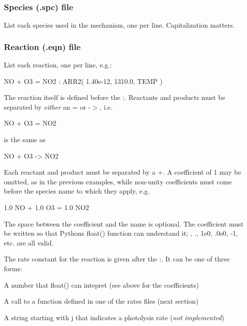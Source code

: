 \subsubsection*{Species (.spc) file}

List each species used in the mechanism, one per line. Capitalization matters.

\subsubsection*{Reaction (.eqn) file}

List each reaction, one per line, e.\+g.\+: \begin{DoxyVerb}NO + O3 = NO2 : ARR2( 1.40e-12, 1310.0, TEMP )
\end{DoxyVerb}


The reaction itself is defined before the {\ttfamily \+:}. Reactants and products must be separated by {\itshape either} an {\ttfamily =} or {\ttfamily -\/$>$}, i.\+e. \begin{DoxyVerb}NO + O3 = NO2
\end{DoxyVerb}


is the same as \begin{DoxyVerb}NO + O3 -> NO2
\end{DoxyVerb}


Each reactant and product must be separated by a {\ttfamily +}. A coefficient of 1 may be omitted, as in the previous examples, while non-\/unity coefficients must come before the species name to which they apply, e.\+g. \begin{DoxyVerb}1.0 NO + 1.0 O3 = 1.0 NO2
\end{DoxyVerb}


The space between the coefficient and the name is optional. The coefficient must be written so that Python\textquotesingle{}s {\ttfamily float()} function can understand it; {}, {.}, {\ttfamily 1e0}, {.\+0e0}, {\ttfamily -\/1}, etc. are all valid.

The rate constant for the reaction is given after the {\ttfamily \+:}. It can be one of three forms\+:


\begin{DoxyEnumerate}
\item A number that {\ttfamily float()} can intepret (see above for the coefficients)
\item A call to a function defined in one of the rates files (next section)
\item A string starting with {\ttfamily j} that indicates a photolysis rate ({\itshape not implemented})
\end{DoxyEnumerate}

